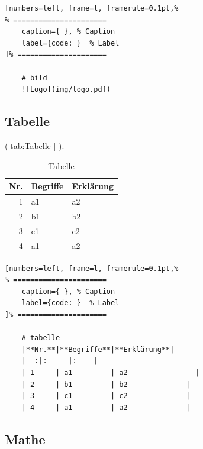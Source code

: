 \lstset{language=Bash} %
\begin{lstlisting}[numbers=left, frame=l, framerule=0.1pt,%
% ======================
	caption={ }, % Caption
	label={code: }  % Label
]% =====================

    # bild
    ![Logo](img/logo.pdf)
\end{lstlisting}

\subsection{Tabelle}\label{tabelle}

(\autoref{tab:Tabelle } ). %

\begin{table}[!hp] %
	\centering
	\begin{tabular} []{rll}
	\toprule %
\textbf{Nr.} & \textbf{Begriffe} & \textbf{Erklärung}\\
	\midrule
1 & a1 & a2\\
2 & b1 & b2\\
3 & c1 & c2\\
4 & a1 & a2\\
	\bottomrule
	\end{tabular}
	\caption[Tabelle ]{Tabelle }	%
	\label{tab:Tabelle }	%
\end{table}

\lstset{language=Bash} %
\begin{lstlisting}[numbers=left, frame=l, framerule=0.1pt,%
% ======================
	caption={ }, % Caption
	label={code: }  % Label
]% =====================

    # tabelle
    |**Nr.**|**Begriffe**|**Erklärung**|
    |--:|:-----|:----|
    | 1     | a1         | a2                |
    | 2     | b1         | b2              |
    | 3     | c1         | c2              |
    | 4     | a1         | a2              |
\end{lstlisting}

\subsection{Mathe}\label{mathe}

